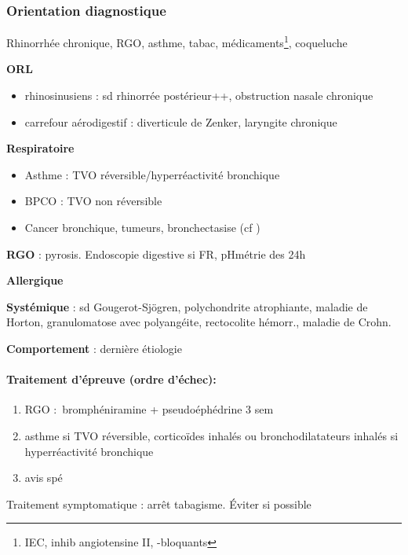 \documentclass[11pt]{article}
\begin{document}
\subsubsection{Orientation diagnostique}
\label{sec:org58ffbcb}
\label{subsec:toux_orientation}
\begin{tcolorbox}
Rhinorrhée chronique, RGO, asthme, tabac, médicaments\footnote{IEC, inhib angiotensine II, \beta{}-bloquants}, coqueluche
\end{tcolorbox}
\textbf{ORL}

\begin{itemize}
\item rhinosinusiens : sd rhinorrée postérieur++, obstruction nasale chronique
\item carrefour aérodigestif : diverticule de Zenker, laryngite chronique
\end{itemize}

\textbf{Respiratoire} 

\begin{itemize}
\item Asthme : TVO réversible/hyperréactivité bronchique
\item BPCO : TVO non réversible
\item Cancer bronchique, tumeurs, bronchectasise (cf
)
\end{itemize}


\textbf{RGO} : pyrosis. Endoscopie digestive si FR, pHmétrie des 24h

\textbf{Allergique} 

\textbf{Systémique} : sd Gougerot-Sjögren, polychondrite atrophiante, maladie
de Horton, granulomatose avec polyangéite, rectocolite hémorr., maladie de
Crohn.

\textbf{Comportement} : dernière étiologie

\paragraph{Traitement d'épreuve (ordre d'échec):}
\label{sec:orgcf897fc}
\begin{enumerate}
\item RGO : bromphéniramine + pseudoéphédrine 3 sem
\item asthme si TVO réversible, corticoïdes inhalés ou bronchodilatateurs inhalés si
hyperréactivité bronchique
\item avis spé
\end{enumerate}

Traitement symptomatique : arrêt tabagisme. Éviter si possible
\end{document}
